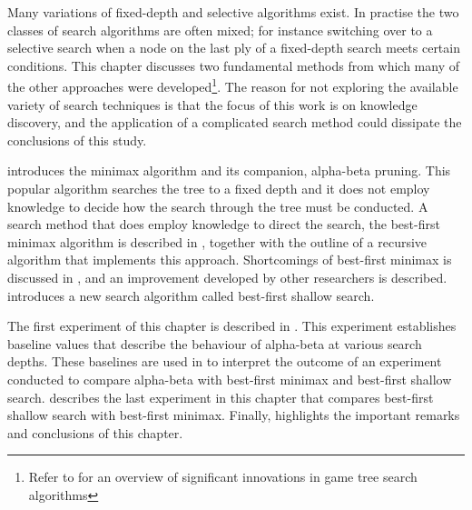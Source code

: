 Many variations of fixed-depth and selective algorithms exist.  In practise the two classes of search algorithms are often mixed; for instance switching over to a selective search when a node on the last ply of a fixed-depth search meets certain conditions. This chapter discusses two fundamental methods from which many of the other  approaches were developed\footnote{Refer to \cite{furnkranz:survey} for an overview of significant innovations in game tree search algorithms}. The reason for not exploring the available variety of search techniques is that the focus of this work is on knowledge discovery, and the application of a complicated search method could dissipate the conclusions of this study.    



 introduces the minimax algorithm and its companion, alpha-beta pruning. This popular algorithm searches the tree to a fixed depth and it does not employ knowledge to decide how the search through the tree must be conducted. A search method that does employ knowledge to direct the search, the best-first minimax algorithm is described in , together with the outline of a recursive algorithm that implements this approach.  Shortcomings of best-first minimax is discussed in , and an improvement developed by other researchers is described.  introduces a new search algorithm called best-first shallow search.

The first experiment of this chapter is described in .  This experiment establishes baseline values that describe the behaviour of alpha-beta at various search depths.  These baselines are used in  to interpret the outcome of an experiment conducted to compare alpha-beta with best-first minimax and best-first shallow search.  describes the last experiment in this chapter that compares best-first shallow search with best-first minimax. 
Finally,  highlights the important remarks and conclusions of this chapter.

